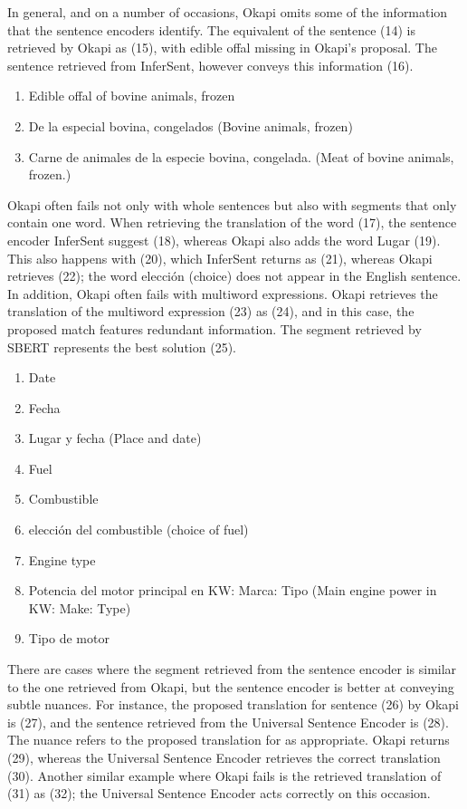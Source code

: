 In general, and on a number of occasions, Okapi omits some of the information that the sentence encoders identify. The equivalent of the sentence (14) is retrieved by Okapi as (15), with edible offal missing in Okapi’s proposal. The sentence retrieved from InferSent, however conveys this information (16).

\begin{enumerate}[resume,label={(\arabic*)}]
	\item	Edible offal of bovine animals, frozen
	\item	De la especial bovina, congelados (Bovine animals, frozen)
	\item	Carne de animales de la especie bovina, congelada. (Meat of bovine animals, frozen.)
\end{enumerate}

Okapi often fails not only with whole sentences but also with segments that only contain one word. When retrieving the translation of the word (17), the sentence encoder InferSent suggest (18), whereas Okapi also adds the word Lugar (19). This also happens with (20), which InferSent returns as (21), whereas Okapi retrieves (22); the word elección (choice) does not appear in the English sentence. In addition, Okapi often fails with multiword expressions. Okapi retrieves the translation of the multiword expression (23) as (24), and in this case, the proposed match features redundant information. The segment retrieved by SBERT represents the best solution (25).

\begin{enumerate}[resume,label={(\arabic*)}]
		\item	Date
		\item	Fecha
		\item	Lugar y fecha (Place and date)
		\item	Fuel
		\item	Combustible
		\item	elección del combustible (choice of fuel)
		\item	Engine type
		\item	Potencia del motor principal en KW: Marca: Tipo (Main engine power in KW: Make: Type)
		\item	Tipo de motor
	
\end{enumerate}

There are cases where the segment retrieved from the sentence encoder is similar to the one retrieved from Okapi, but the sentence encoder is better at conveying subtle nuances. For instance, the proposed translation for sentence (26) by Okapi is (27), and the sentence retrieved from the Universal Sentence Encoder is (28). The nuance refers to the proposed translation for as appropriate. Okapi returns (29), whereas the Universal Sentence Encoder retrieves the correct translation (30). Another similar example where Okapi fails is the retrieved translation of (31) as (32); the Universal Sentence Encoder acts correctly on this occasion.

